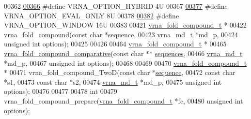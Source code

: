 \begin{DoxyCode}
00362 
\hyperlink{group__fold__compound_ga8f681fa12b8d4b348bf58415fd1fc82f}{00366} \textcolor{preprocessor}{#define VRNA\_OPTION\_HYBRID          4U}
00367 
\hyperlink{group__fold__compound_ga61469c423131552c8483229f8b6c7e0e}{00377} \textcolor{preprocessor}{#define VRNA\_OPTION\_EVAL\_ONLY       8U}
00378 
\hyperlink{group__fold__compound_ga2b2a8009ccdccc3eb1571556261aee8e}{00382} \textcolor{preprocessor}{#define VRNA\_OPTION\_WINDOW          16U}
00383 
00421 \hyperlink{group__fold__compound_structvrna__fc__s}{vrna\_fold\_compound\_t} *
00422 \hyperlink{group__fold__compound_ga6601d994ba32b11511b36f68b08403be}{vrna\_fold\_compound}(\textcolor{keyword}{const} \textcolor{keywordtype}{char}   *\hyperlink{group__fold__compound_a87f6abcda89cfb7a486c97e1f5371525}{sequence},
00423                    \hyperlink{group__model__details_structvrna__md__s}{vrna\_md\_t}    *md\_p,
00424                    \textcolor{keywordtype}{unsigned} \textcolor{keywordtype}{int} options);
00425 
00426 
00464 \hyperlink{group__fold__compound_structvrna__fc__s}{vrna\_fold\_compound\_t} *
00465 \hyperlink{group__fold__compound_gad6bacc816af274922b13d947f708aa0c}{vrna\_fold\_compound\_comparative}(\textcolor{keyword}{const} \textcolor{keywordtype}{char}   **
      \hyperlink{group__fold__compound_a965dbb42f2e13cace5aa3bbab4396530}{sequences},
00466                                \hyperlink{group__model__details_structvrna__md__s}{vrna\_md\_t}    *md\_p,
00467                                \textcolor{keywordtype}{unsigned} \textcolor{keywordtype}{int} options);
00468 
00469 
00470 \hyperlink{group__fold__compound_structvrna__fc__s}{vrna\_fold\_compound\_t} *
00471 vrna\_fold\_compound\_TwoD(\textcolor{keyword}{const} \textcolor{keywordtype}{char}    *\hyperlink{group__fold__compound_a87f6abcda89cfb7a486c97e1f5371525}{sequence},
00472                         \textcolor{keyword}{const} \textcolor{keywordtype}{char}    *s1,
00473                         \textcolor{keyword}{const} \textcolor{keywordtype}{char}    *s2,
00474                         \hyperlink{group__model__details_structvrna__md__s}{vrna\_md\_t}     *md\_p,
00475                         \textcolor{keywordtype}{unsigned} \textcolor{keywordtype}{int}  options);
00476 
00477 
00478 \textcolor{keywordtype}{int}
00479 vrna\_fold\_compound\_prepare(\hyperlink{group__fold__compound_structvrna__fc__s}{vrna\_fold\_compound\_t} *fc,
00480                            \textcolor{keywordtype}{unsigned} \textcolor{keywordtype}{int}         options);

\end{DoxyCode}

